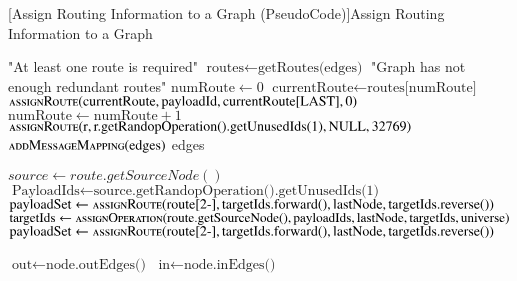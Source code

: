 \begin{breakablealgorithm}
	[Assign Routing Information to a Graph (PseudoCode)]{Assign Routing Information to a Graph}\label{alg:simpleRouting}
	\begin{algorithmic}[1]
		\label{alg:assignRouting-line}
		\Throw "At least one route is required"
		\EndIf
		\State $\text{routes} \gets \text{getRoutes(edges)}$\label{alg:startAssignValidRoutes-line}
		\Throw "Graph has not enough redundant routes"
		\EndIf
		\State $\text{numRoute} \gets 0$
		\State $\text{currentRoute} \gets \text{routes[numRoute]}$
		\State $\Call{assignRoute}{\text{currentRoute}, \text{payloadId}, \text{currentRoute[LAST]},0}$
		\State $\text{numRoute} \gets \text{numRoute} + 1$
		\EndWhile\label{alg:endAssignValidRoutes-line}
		\label{alg:startAssignUnusedRoutes-line}
		\State $\Call{assignRoute}{\text{r}, \text{r.getRandopOperation().getUnusedIds(1)}, \text{NULL},32769}$
		\EndFor\label{alg:endAssignUnusedRoutes-line}
		\State $\Call{addMessageMapping}{\text{edges}}$
		\Return edges
		\EndFunction
		\item[]		
		\label{alg:startAssignRoute-line}
		\State $source \gets route.getSourceNode()$
		\State $\text{PayloadIds} \gets \text{source.getRandopOperation().getUnusedIds(1)}$
		\State $\text{payloadSet} \gets \Call{assignRoute}{\text{route[2-]}, \text{targetIds.forward()}, \text{lastNode}, \text{targetIds.reverse()}}$
		\Else
		\State $\text{targetIds}  \gets \Call{assignOperation}{\text{route.getSourceNode()}, \text{payloadIds}, \text{lastNode}, \text{targetIds}, \text{universe}}$
		\State $\text{payloadSet} \gets \Call{assignRoute}{\text{route[2-]}, \text{targetIds.forward()}, \text{lastNode}, \text{targetIds.reverse()}}$
		\EndIf	
		\EndFunction\label{alg:endAssignRoute-line}
		\item[]		
		\label{alg:startAssignOperation-line}
		\State $\text{out} \gets \text{node.outEdges()}$
		\State $\text{in} \gets \text{node.inEdges()}$

\end{algorithmic}
\end{breakablealgorithm}
